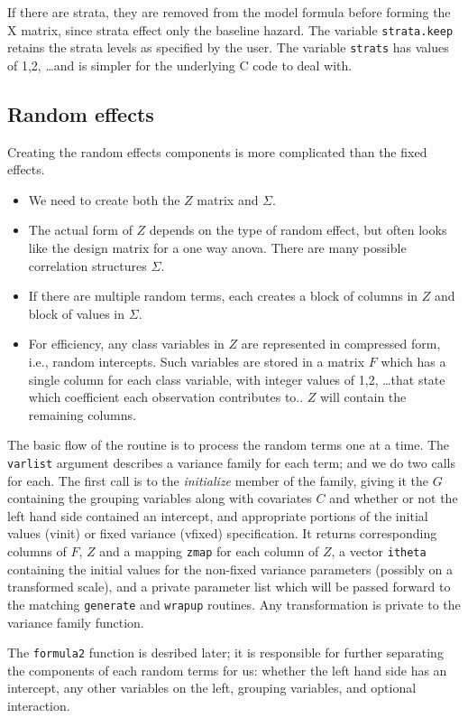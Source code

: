 \documentclass{article}
\begin{document}
If there are strata, they are removed from the model formula
before forming the X matrix, since strata effect only the
baseline hazard.
The variable \Verb!strata.keep! retains the strata levels as specified by
the user.
The variable \Verb!strats! has values of 1,2, \ldots and
is simpler for the underlying C code to deal with.

\subsection{Random effects}
Creating the random effects components is more complicated than the 
fixed effects.
\begin{itemize}
  \item We need to create both the $Z$ matrix and $\Sigma$.
  \item The actual form of $Z$ depends on the type of random
    effect, but often looks like the design matrix for a one way anova.
    There are many possible correlation structures $\Sigma$.
  \item If there are multiple random terms, each creates a block of columns
    in $Z$ and block of values in $\Sigma$.
  \item For efficiency, any class variables in $Z$ are
    represented in compressed form, i.e., random intercepts.  
    Such variables are stored in a matrix $F$ which has a single column 
    for each class variable, with integer
    values of 1,2, \ldots that state which coefficient each observation
    contributes to.. $Z$ will contain the remaining
    columns.
\end{itemize}
The basic flow of the routine is to process the random terms one at a time.
The \Verb!varlist! argument 
describes a variance family for each term; and
we do two calls for each.
The first call is to the \emph{initialize} member of the family, giving it the
$G$ containing the grouping variables along with covariates
$C$ and whether or not the left hand side contained an intercept, and
appropriate portions of the initial values (vinit) or fixed variance
(vfixed) specification.
It returns corresponding columns of $F$, $Z$ and a mapping \Verb!zmap! for
each column of $Z$,  a vector \Verb!itheta! containing
the initial values for the non-fixed variance parameters (possibly on
a transformed scale), and a private 
parameter list which will be passed forward to the matching \Verb!generate!
and \Verb!wrapup! routines.
Any transformation is private to the variance family function.

The \Verb!formula2! function is desribed later; it is responsible for 
further separating the components of each random terms for us: 
whether the left hand side has
an intercept, any other variables on the left, grouping variables, and
optional interaction.
\end{document}
